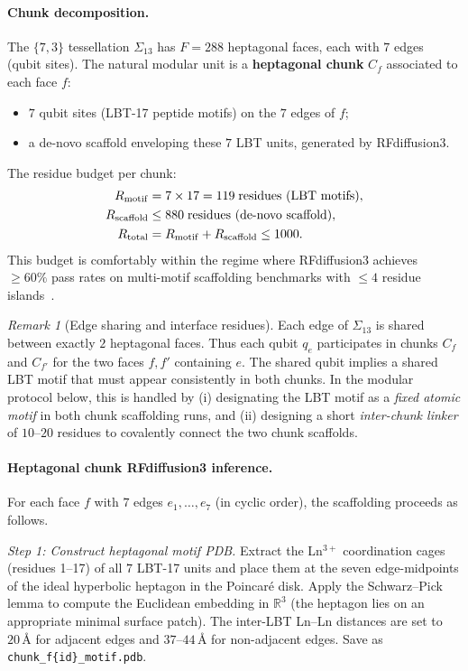 \documentclass[11pt,oneside]{amsbook}
\numberwithin{equation}{section}
\theoremstyle{plain}
\theoremstyle{definition}
\theoremstyle{remark}
\newtheorem{remark}[theorem]{Remark}
\begin{document}
\paragraph{Chunk decomposition.}
The $\{7,3\}$ tessellation $\Sigma_{13}$ has $F=288$ heptagonal faces, each
with $7$ edges (qubit sites).  The natural modular unit is a
\textbf{heptagonal chunk} $C_f$ associated to each face $f$:
\begin{itemize}
\item $7$ qubit sites (LBT-17 peptide motifs) on the $7$ edges of $f$;
\item a de-novo scaffold enveloping these $7$ LBT units, generated by RFdiffusion3.
\end{itemize}
The residue budget per chunk:
\begin{align}
  R_{\mathrm{motif}} &= 7 \times 17 = 119\;\text{residues (LBT motifs)}, \notag\\
  R_{\mathrm{scaffold}} &\le 880\;\text{residues (de-novo scaffold)}, \notag\\
  R_{\mathrm{total}} &= R_{\mathrm{motif}} + R_{\mathrm{scaffold}}
    \le 1000.\label{eq:residue_budget}
\end{align}
This budget is comfortably within the regime where RFdiffusion3 achieves
$\ge 60\%$ pass rates on multi-motif scaffolding benchmarks with $\le 4$
residue islands~\cite{ButcherEtAl2025}.

\begin{remark}[Edge sharing and interface residues]
Each edge of $\Sigma_{13}$ is shared between exactly $2$ heptagonal faces.
Thus each qubit $q_e$ participates in chunks $C_f$ and $C_{f'}$ for the two
faces $f,f'$ containing $e$.  The shared qubit implies a shared LBT motif
that must appear consistently in both chunks.  In the modular protocol below,
this is handled by (i) designating the LBT motif as a \emph{fixed atomic
motif} in both chunk scaffolding runs, and (ii) designing a short
\emph{inter-chunk linker} of $10$--$20$ residues to covalently connect
the two chunk scaffolds.
\end{remark}

\paragraph{Heptagonal chunk RFdiffusion3 inference.}
For each face $f$ with $7$ edges $e_1,\ldots,e_7$ (in cyclic order), the
scaffolding proceeds as follows.

\medskip
\noindent\textit{Step 1: Construct heptagonal motif PDB.}
Extract the Ln$^{3+}$ coordination cages (residues 1--17) of all $7$
LBT-17 units and place them at the seven edge-midpoints of the ideal
hyperbolic heptagon in the Poincar\'e disk.  Apply the Schwarz--Pick
lemma to compute the Euclidean embedding in $\mathbb{R}^3$ (the
heptagon lies on an appropriate minimal surface patch).  The inter-LBT
Ln--Ln distances are set to $20\,\text{\AA}$ for adjacent edges and
$37$--$44\,\text{\AA}$ for non-adjacent edges.  Save as
\texttt{chunk\_f\{id\}\_motif.pdb}.
\end{document}
